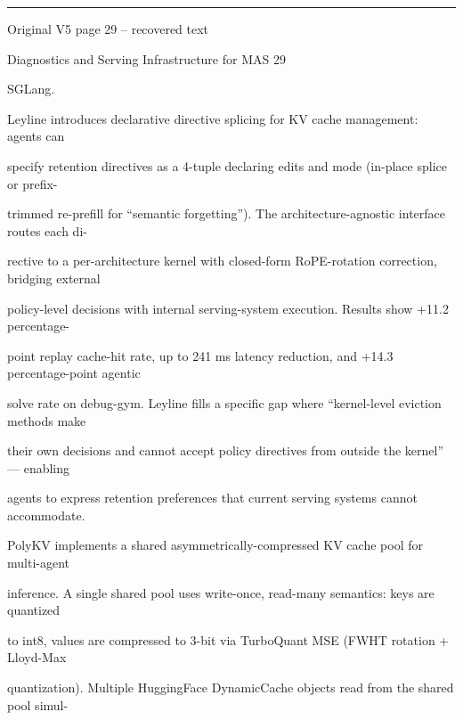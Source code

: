 \par\smallskip\noindent\rule{\textwidth}{0.4pt}\par{\sffamily\footnotesize Original V5 page 29 -- recovered text}\par\begin{flushleft}\footnotesize\ttfamily
\par\smallskip
\par\smallskip
\noindent Diagnostics and Serving Infrastructure for MAS 29\par
\par\smallskip
\par\smallskip
\par\smallskip
\noindent SGLang.\par
\noindent  Leyline introduces declarative directive splicing for KV cache management: agents can\par
\noindent specify retention directives as a 4-tuple declaring edits and mode (in-place splice or prefix-\par
\noindent trimmed re-prefill for “semantic forgetting”). The architecture-agnostic interface routes each di-\par
\noindent rective to a per-architecture kernel with closed-form RoPE-rotation correction, bridging external\par
\noindent policy-level decisions with internal serving-system execution. Results show +11.2 percentage-\par
\noindent point replay cache-hit rate, up to 241 ms latency reduction, and +14.3 percentage-point agentic\par
\noindent solve rate on debug-gym. Leyline fills a specific gap where “kernel-level eviction methods make\par
\noindent their own decisions and cannot accept policy directives from outside the kernel” — enabling\par
\noindent agents to express retention preferences that current serving systems cannot accommodate.\par
\noindent  PolyKV implements a shared asymmetrically-compressed KV cache pool for multi-agent\par
\noindent inference. A single shared pool uses write-once, read-many semantics: keys are quantized\par
\noindent to int8, values are compressed to 3-bit via TurboQuant MSE (FWHT rotation + Lloyd-Max\par
\noindent quantization). Multiple HuggingFace DynamicCache objects read from the shared pool simul-\par

\end{flushleft}

